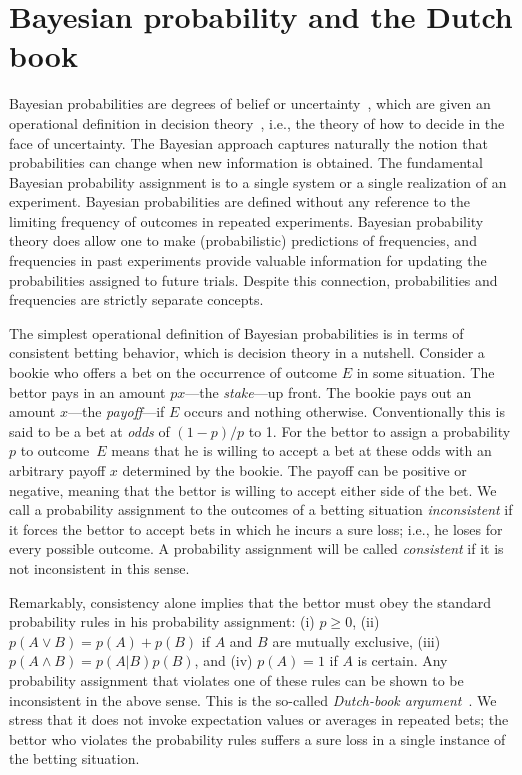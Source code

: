 \section{Bayesian probability and the Dutch book}

Bayesian probabilities are degrees of belief or
uncertainty~\cite{BernardoSmith}, which are given an operational
definition in decision theory~\cite{Savage72}, i.e., the theory of
how to decide in the face of uncertainty.  The Bayesian approach
captures naturally the notion that probabilities can change when new
information is obtained.  The fundamental Bayesian probability
assignment is to a single system or a single realization of an
experiment.  Bayesian probabilities are defined without any
reference to the limiting frequency of outcomes in repeated
experiments.  Bayesian probability theory does allow one to make
(probabilistic) predictions of frequencies, and frequencies in past
experiments provide valuable information for updating the
probabilities assigned to future trials. Despite this connection,
probabilities and frequencies are strictly separate concepts.

The simplest operational definition of Bayesian probabilities is in
terms of consistent betting behavior, which is decision theory in a
nutshell.  Consider a bookie who offers a bet on the occurrence of
outcome $E$ in some situation.  The bettor pays in an amount
$px$---the {\it stake\/}---up front. The bookie pays out an amount
$x$---the {\it payoff\/}---if $E$ occurs and nothing otherwise.
Conventionally this is said to be a bet at {\it odds\/} of $(1-p)/p$
to 1.  For the bettor to assign a probability $p$ to outcome~$E$
means that he is willing to accept a bet at these odds with an
arbitrary payoff $x$ determined by the bookie.  The payoff can be
positive or negative, meaning that the bettor is willing to accept
either side of the bet. We call a probability assignment to the
outcomes of a betting situation {\it inconsistent\/} if it forces the
bettor to accept bets in which he incurs a sure loss; i.e., he loses
for every possible outcome.  A probability assignment will be called
{\it consistent\/} if it is not inconsistent in this sense.

Remarkably, consistency alone implies that the bettor must obey the
standard probability rules in his probability assignment: (i)
$p\ge0$, (ii) $p(A\vee B)=p(A)+p(B)$ if $A$ and $B$ are mutually
exclusive, (iii) $p(A\wedge B)=p(A|B)p(B)$, and (iv) $p(A)=1$ if $A$
is certain. Any probability assignment that violates one of these
rules can be shown to be inconsistent in the above sense.  This is
the so-called {\it Dutch-book argument}~\cite{DeFinettiBook,Earman}.
We stress that it does not invoke expectation values or averages in
repeated bets; the bettor who violates the probability rules suffers
a sure loss in a single instance of the betting situation.


